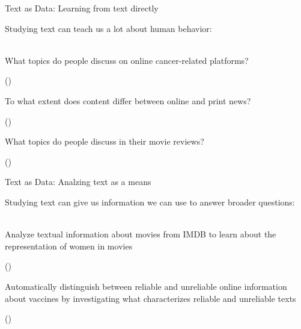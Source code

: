 \documentclass[handout]{beamer}
\begin{document}
\begin{frame}{Text as Data: \small{Learning from text directly}}
	
	Studying text can teach us a lot about human behavior: \\~
	
	What topics do people discuss on online cancer-related platforms? \\
	\begin{tiny}
		(\cite{sanders_different_2020}) \\
	\end{tiny}

	To what extent does content differ between online and print news? \\
	\begin{tiny}
	(\cite{burggraaff_through_2020}) \\
	\end{tiny}

	What topics do people discuss in their movie reviews? \\
	\begin{tiny}
	(\cite{schneider_what_2020}) \\
	\end{tiny}	

	
\end{frame}


\begin{frame}{Text as Data: \small{Analzing text as a means}}
	
	Studying text can give us information we can use to answer broader questions: \\~
	
	Analyze textual information about movies from IMDB to learn about the representation of women in movies \\
	\begin{tiny}
	(\cite{poma-murialdo_gender_2019}) \\
	\end{tiny}

	Automatically distinguish between reliable and unreliable online information about vaccines by investigating what characterizes reliable and unreliable texts \\
	\begin{tiny}
	(\cite{meppelink_reliable_2021}) \\
	\end{tiny}	
	

	
\end{frame}
\end{document}
